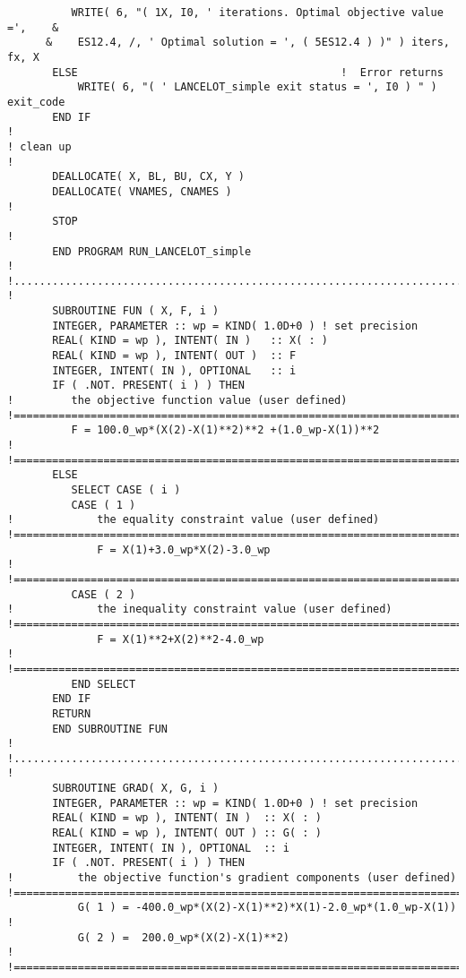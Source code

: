\documentclass{galahad}
\begin{document}
{\begin{verbatim}
          WRITE( 6, "( 1X, I0, ' iterations. Optimal objective value =',    &
      &    ES12.4, /, ' Optimal solution = ', ( 5ES12.4 ) )" ) iters, fx, X
       ELSE                                         !  Error returns
           WRITE( 6, "( ' LANCELOT_simple exit status = ', I0 ) " ) exit_code
       END IF
!
! clean up
!
       DEALLOCATE( X, BL, BU, CX, Y )
       DEALLOCATE( VNAMES, CNAMES )
!
       STOP
!
       END PROGRAM RUN_LANCELOT_simple
!
!.............................................................................
!
       SUBROUTINE FUN ( X, F, i )
       INTEGER, PARAMETER :: wp = KIND( 1.0D+0 ) ! set precision
       REAL( KIND = wp ), INTENT( IN )   :: X( : )
       REAL( KIND = wp ), INTENT( OUT )  :: F
       INTEGER, INTENT( IN ), OPTIONAL   :: i
       IF ( .NOT. PRESENT( i ) ) THEN 
!         the objective function value (user defined)
!==============================================================================
          F = 100.0_wp*(X(2)-X(1)**2)**2 +(1.0_wp-X(1))**2                    !
!==============================================================================
       ELSE
          SELECT CASE ( i )
          CASE ( 1 )   
!             the equality constraint value (user defined)
!==============================================================================
              F = X(1)+3.0_wp*X(2)-3.0_wp                                     !
!==============================================================================
          CASE ( 2 ) 
!             the inequality constraint value (user defined)
!==============================================================================
              F = X(1)**2+X(2)**2-4.0_wp                                      !
!==============================================================================
          END SELECT
       END IF
       RETURN
       END SUBROUTINE FUN
!
!.............................................................................
!
       SUBROUTINE GRAD( X, G, i )
       INTEGER, PARAMETER :: wp = KIND( 1.0D+0 ) ! set precision
       REAL( KIND = wp ), INTENT( IN )  :: X( : )
       REAL( KIND = wp ), INTENT( OUT ) :: G( : )
       INTEGER, INTENT( IN ), OPTIONAL  :: i
       IF ( .NOT. PRESENT( i ) ) THEN 
!          the objective function's gradient components (user defined)
!==============================================================================
           G( 1 ) = -400.0_wp*(X(2)-X(1)**2)*X(1)-2.0_wp*(1.0_wp-X(1))        !
           G( 2 ) =  200.0_wp*(X(2)-X(1)**2)                                  !
!==============================================================================

\end{verbatim}}
\end{document}
